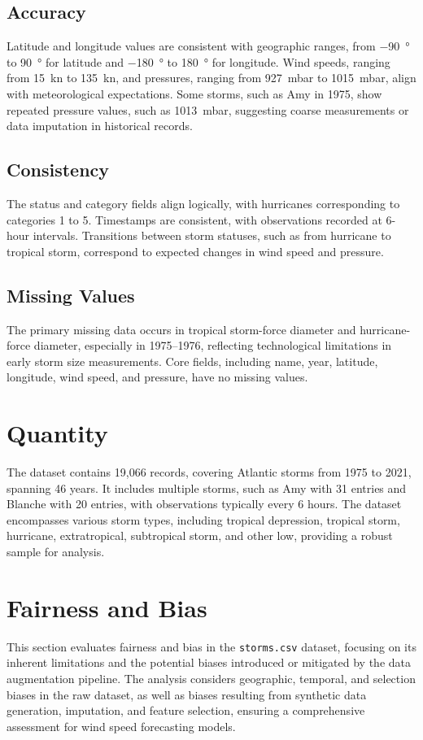\subsection{Accuracy}
Latitude and longitude values are consistent with geographic ranges, from \SI{-90}{\degree} to \SI{90}{\degree} for latitude and \SI{-180}{\degree} to \SI{180}{\degree} for longitude. Wind speeds, ranging from \SI{15}{\knot} to \SI{135}{\knot}, and pressures, ranging from \SI{927}{\milli\bar} to \SI{1015}{\milli\bar}, align with meteorological expectations. Some storms, such as Amy in 1975, show repeated pressure values, such as \SI{1013}{\milli\bar}, suggesting coarse measurements or data imputation in historical records.

\subsection{Consistency}
The status and category fields align logically, with hurricanes corresponding to categories 1 to 5. Timestamps are consistent, with observations recorded at 6-hour intervals. Transitions between storm statuses, such as from hurricane to tropical storm, correspond to expected changes in wind speed and pressure.

\subsection{Missing Values}
The primary missing data occurs in tropical storm-force diameter and hurricane-force diameter, especially in 1975--1976, reflecting technological limitations in early storm size measurements. Core fields, including name, year, latitude, longitude, wind speed, and pressure, have no missing values.

\section{Quantity}
The dataset contains 19,066 records, covering Atlantic storms from 1975 to 2021, spanning 46 years. It includes multiple storms, such as Amy with 31 entries and Blanche with 20 entries, with observations typically every 6 hours. The dataset encompasses various storm types, including tropical depression, tropical storm, hurricane, extratropical, subtropical storm, and other low, providing a robust sample for analysis.

\section{Fairness and Bias}
This section evaluates fairness and bias in the \texttt{storms.csv} dataset, focusing on its inherent limitations and the potential biases introduced or mitigated by the data augmentation pipeline. The analysis considers geographic, temporal, and selection biases in the raw dataset, as well as biases resulting from synthetic data generation, imputation, and feature selection, ensuring a comprehensive assessment for wind speed forecasting models.

